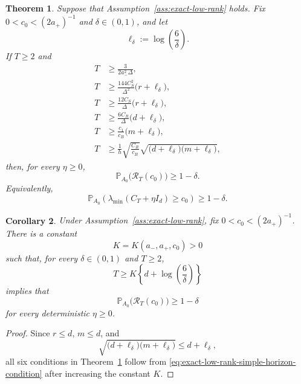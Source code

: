 \documentclass[11pt]{article}
\newtheorem{theorem}{Theorem}[section]
\newtheorem{corollary}[theorem]{Corollary}
\begin{document}
\begin{theorem}%
\label{thm:exact-low-rank-curvature}
Suppose that Assumption~\ref{ass:exact-low-rank} holds. Fix
$0<c_0<(2a_+)^{-1}$ and $\delta\in(0,1)$, and let
\[
    \ell_\delta:=\log\!\left(\frac{6}{\delta}\right).
\]
If $T\geq2$ and
\begin{align}
    T &\geq \frac{3}{2a_-^2\Delta},
\label{eq:curvature-init-condition}\\
    T &\geq \frac{144C_S^2}{\Delta^2}\bigl(r+\ell_\delta\bigr),
\label{eq:curvature-stable-square-condition}\\
    T &\geq \frac{12C_S}{\Delta}\bigl(r+\ell_\delta\bigr),
\label{eq:curvature-stable-linear-condition}\\
    T &\geq \frac{6C_R}{\Delta}\bigl(d+\ell_\delta\bigr),
\label{eq:curvature-cross-condition}\\
    T &\geq \frac{c_1}{c_B}\bigl(m+\ell_\delta\bigr),
\label{eq:curvature-brownian-condition}\\
    T &\geq
    \frac{1}{h}\sqrt{\frac{C_R}{c_B}}
    \sqrt{\bigl(d+\ell_\delta\bigr)\bigl(m+\ell_\delta\bigr)},
\label{eq:curvature-triangular-condition}
\end{align}
then, for every $\eta\geq0$,
\begin{equation}
    \mathbb P_{A_0}\bigl(\mathcal R_T(c_0)\bigr)
    \geq1-\delta.
\label{eq:exact-low-rank-curvature-probability}
\end{equation}
Equivalently,
\[
    \mathbb P_{A_0}\!\left(
        \lambda_{\min}(C_T+\eta I_d)\geq c_0
    \right)
    \geq1-\delta.
\]
\end{theorem}

\begin{corollary}%
\label{cor:exact-low-rank-curvature-simple}
Under Assumption~\ref{ass:exact-low-rank}, fix
$0<c_0<(2a_+)^{-1}$. There is a constant
\[
    K=K(a_-,a_+,c_0)>0
\]
such that, for every $\delta\in(0,1)$ and $T\geq2$,
\begin{equation}
    T\geq K\left\{d+\log\!\left(\frac{6}{\delta}\right)\right\}
\label{eq:exact-low-rank-simple-horizon-condition}
\end{equation}
implies that
\[
    \mathbb P_{A_0}\bigl(\mathcal R_T(c_0)\bigr)\geq1-\delta
\]
for every deterministic $\eta\geq0$.
\end{corollary}

\begin{proof}%
Since $r\leq d$, $m\leq d$, and
\[
    \sqrt{\bigl(d+\ell_\delta\bigr)\bigl(m+\ell_\delta\bigr)}
    \leq d+\ell_\delta,
\]
all six conditions in Theorem~\ref{thm:exact-low-rank-curvature} follow from
\eqref{eq:exact-low-rank-simple-horizon-condition} after increasing the
constant $K$.
\end{proof}
\end{document}
